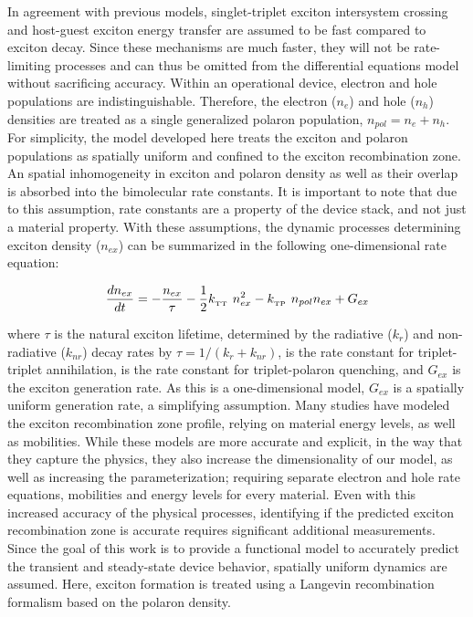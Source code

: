 \documentclass[../thesis.tex]{subfiles}
\begin{document}
In agreement with previous models, singlet-triplet exciton intersystem crossing and host-guest exciton energy transfer are assumed to be fast compared to exciton decay.\supercite{Reineke2007,Baldo2000a,Turro1991a}
Since these mechanisms are much faster, they will not be rate-limiting processes and can thus be omitted from the differential equations model without sacrificing accuracy.
Within an operational device, electron and hole populations are indistinguishable.
Therefore, the electron ($n_e$) and hole ($n_h$) densities are treated as a single generalized polaron population, $n_{pol}=n_e+n_h$.
For simplicity, the model developed here treats the exciton and polaron populations as spatially uniform and confined to the exciton recombination zone.  An spatial inhomogeneity in exciton and polaron density as well as their overlap is absorbed into the bimolecular rate constants.
It is important to note that due to this assumption, rate constants are a property of the device stack, and not just a material property.
With these assumptions, the dynamic processes determining exciton density ($n_{ex}$) can be summarized in the following one-dimensional rate equation:

\begin{equation}
\frac{dn_{ex}}{dt} = - \frac{n_{ex}}{\tau}-\frac{1}{2}k_{_\text{\tiny TT}}\  n_{ex}^2-k_{_\text{\tiny TP}}\  n_{pol}n_{ex}+G_{ex}
\label{eqn:exciton_rate}
\end{equation}

where $\tau$ is the natural exciton lifetime, determined by the radiative ($k_r$) and non-radiative ($k_{nr}$) decay rates by $\tau=1/(k_r+k_{nr})$, \ktt is the rate constant for triplet-triplet annihilation, \ktp is the rate constant for triplet-polaron quenching, and $G_{ex}$ is the exciton generation rate.  
As this is a one-dimensional model, $G_{ex}$ is a spatially uniform generation rate, a simplifying assumption.
Many studies have modeled the exciton recombination zone profile, relying on material energy levels, as well as mobilities.\supercite{Rihani2006,Hassine2001,Hassine2002,Ruhstaller2003,Ruhstaller2001}
While these models are more accurate and explicit, in the way that they capture the physics, they also increase the dimensionality of our model, as well as increasing the parameterization; requiring separate electron and hole rate equations, mobilities and energy levels for every material.\supercite{Coehoorn2015}
Even with this increased accuracy of the physical processes, identifying if the predicted exciton recombination zone is accurate requires significant additional measurements.
Since the goal of this work is to provide a functional model to accurately predict the transient and steady-state device behavior, spatially uniform dynamics are assumed.
Here, exciton formation is treated using a Langevin recombination formalism based on the polaron density.\supercite{Ruhstaller2003,Pinner1999,Blom1996}
\end{document}
